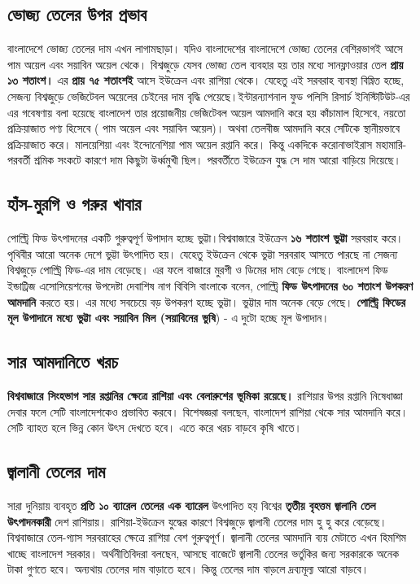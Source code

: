 \documentclass[11pt]{article}
\begin{document}
\subsection{ভোজ্য তেলের উপর প্রভাব}
\label{sec:orgfdb7450}
বাংলাদেশে ভোজ্য তেলের দাম এখন লাগামছাড়া। যদিও বাংলাদেশের বাংলাদেশে ভোজ্য
তেলের বেশিরভাগই আসে পাম অয়েল এবং সয়াবিন অয়েল থেকে। বিশ্বজুড়ে যেসব ভোজ্য
তেল ব্যবহার হয় তার মধ্যে সানফ্লাওয়ার তেল \textbf{প্রায় ১৩ শতাংশ।} এর \textbf{প্রায় ৭৫ শতাংশই}
আসে ইউক্রেন এবং রাশিয়া থেকে। যেহেতু এই সরবরাহ ব্যবস্থা বিঘ্নিত হচ্ছে, সেজন্য
বিশ্বজুড়ে ভেজিটেবল অয়েলের চেইনের দাম বৃদ্ধি পেয়েছে।ইন্টারন্যাশনাল ফুড পলিসি
রিসার্চ ইনিস্টিটিউট-এর এর গবেষণায় বলা হয়েছে বাংলাদেশ তার প্রয়োজনীয়
ভেজিটেবল অয়েল আমদানি করে হয় কাঁচামাল হিসেবে, নয়তো প্রক্রিয়াজাত পণ্য হিসেবে
( পাম অয়েল এবং সয়াবিন অয়েল)। অথবা তেলবীজ আমদানি করে সেটিকে স্থানীয়ভাবে
প্রক্রিয়াজাত করে। মালয়েশিয়া এবং ইন্দোনেশিয়া পাম অয়েল রপ্তানি করে। কিন্তু
একদিকে করোনাভাইরাস মহামারি-পরবর্তী শ্রমিক সংকটে কারণে দাম কিছুটা উর্ধ্বমুখী
ছিল। পরবর্তীতে ইউক্রেন যুদ্ধ সে দাম আরো বাড়িয়ে দিয়েছে।

\subsection{হাঁস-মুরগি ও গরুর খাবার}
\label{sec:org2e0982e}
পোল্ট্রি ফিড উৎপাদনের একটি গুরুত্বপূর্ণ উপাদান হচ্ছে ভুট্টা।বিশ্ববাজারে ইউক্রেন
\textbf{১৬ শতাংশ ভুট্টা} সরবরাহ করে। পৃথিবীর আরো অনেক দেশে ভুট্টা উৎপাদিত হয়। যেহেতু
ইউক্রেন থেকে ভুট্টা সরবরাহ আসতে পারছে না সেজন্য বিশ্বজুড়ে পোল্ট্রি ফিড-এর দাম
বেড়েছে। এর ফলে বাজারে মুরগী ও ডিমের দাম বেড়ে গেছে। বাংলাদেশ ফিড
ইন্ডাট্রিজ এসোসিয়েশনের উপদেষ্টা দেবাশিষ নাগ বিবিসি বাংলাকে বলেন, পোল্ট্রি
\textbf{ফিড উৎপাদনের ৬০ শতাংশ উপকরণ আমদানি} করতে হয়। এর মধ্যে সবচেয়ে বড় উপকরণ
হচ্ছে ভুট্টা। ভুট্টার দাম অনেক বেড়ে গেছে। \textbf{পোল্ট্রি ফিডের মূল উপাদানে মধ্যে ভুট্টা
এবং সয়াবিন মিল (সয়াবিনের ভুষি}) - এ দুটো হচ্ছে মূল উপাদান।

\subsection{সার আমদানিতে খরচ}
\label{sec:org7024d46}
\textbf{বিশ্ববাজারে সিংহভাগ সার রপ্তানির ক্ষেত্রে রাশিয়া এবং বেলারুশের ভূমিকা রয়েছে।}
রাশিয়ার উপর রপ্তানি নিষেধাজ্ঞা দেবার ফলে সেটি বাংলাদেশকেও প্রভাবিত করবে।
বিশেষজ্ঞরা বলছেন, বাংলাদেশ রাশিয়া থেকে সার আমদানি করে। সেটি ব্যাহত হলে
ভিন্ন কোন উৎস দেখতে হবে। এতে করে খরচ বাড়বে কৃষি খাতে।

\subsection{জ্বালানী তেলের দাম}
\label{sec:org763b8b7}
সারা দুনিয়ায় ব্যবহৃত \textbf{প্রতি ১০ ব্যারেল তেলের এক ব্যারেল} উৎপাদিত হয় বিশ্বের
\textbf{তৃতীয় বৃহত্তম জ্বালানি তেল উৎপাদনকারী} দেশ রাশিয়ায়।  রাশিয়া-ইউক্রেন যুদ্ধের
কারণে বিশ্বজুড়ে জ্বালানী তেলের দাম হু হু করে বেড়েছে। বিশ্ববাজারে তেল-গ্যাস
সরবরাহের ক্ষেত্রে রাশিয়া বেশ গুরুত্বপূর্ণ। জ্বালানী তেলের আমদানি ব্যয় মেটাতে
এখন হিমশিম খাচ্ছে বাংলাদেশ সরকার। অর্থনীতিবিদরা বলছেন, আসছে বাজেটে
জ্বালানী তেলের ভর্তুকির জন্য সরকারকে অনেক টাকা গুণতে হবে। অন্যথায় তেলের দাম
বাড়াতে হবে। কিন্তু তেলের দাম বাড়লে দ্রব্যমূল্য আরো বাড়বে।
\end{document}
